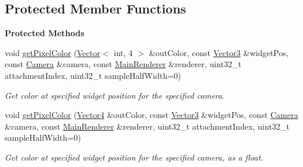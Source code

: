 \subsection*{Protected Member Functions}
\begin{Indent}\textbf{ Protected Methods}\par
\begin{DoxyCompactItemize}
\item 
\mbox{\label{classrev_1_1_mouse_picker_a8828a656ec9e6235690744b7b3e7c38b}} 
void \mbox{\hyperlink{classrev_1_1_mouse_picker_a8828a656ec9e6235690744b7b3e7c38b}{get\+Pixel\+Color}} (\mbox{\hyperlink{classrev_1_1_vector}{Vector}}$<$ int, 4 $>$ \&out\+Color, const \mbox{\hyperlink{classrev_1_1_vector}{Vector3}} \&widget\+Pos, const \mbox{\hyperlink{classrev_1_1_camera}{Camera}} \&camera, const \mbox{\hyperlink{classrev_1_1_main_renderer}{Main\+Renderer}} \&renderer, uint32\+\_\+t attachment\+Index, uint32\+\_\+t sample\+Half\+Width=0)
\begin{DoxyCompactList}\small\item\em Get color at specified widget position for the specified camera. \end{DoxyCompactList}\item 
\mbox{\label{classrev_1_1_mouse_picker_a59517810edbce044ff3b795271be355b}} 
void \mbox{\hyperlink{classrev_1_1_mouse_picker_a59517810edbce044ff3b795271be355b}{get\+Pixel\+Color}} (\mbox{\hyperlink{classrev_1_1_vector}{Vector4}} \&out\+Color, const \mbox{\hyperlink{classrev_1_1_vector}{Vector3}} \&widget\+Pos, const \mbox{\hyperlink{classrev_1_1_camera}{Camera}} \&camera, const \mbox{\hyperlink{classrev_1_1_main_renderer}{Main\+Renderer}} \&renderer, uint32\+\_\+t attachment\+Index, uint32\+\_\+t sample\+Half\+Width=0)
\begin{DoxyCompactList}\small\item\em Get color at specified widget position for the specified camera, as a float. \end{DoxyCompactList}\end{DoxyCompactItemize}
\end{Indent}
